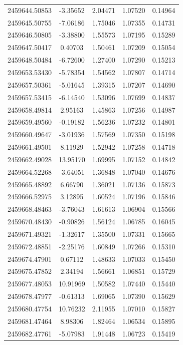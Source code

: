 \documentclass[traditabstract,longauth]{aa}
\begin{document}
\begin{longtable}{lcccc}
2459644.50853 & -3.35652 & 2.04471 & 1.07520 & 0.14964\\
2459645.50755 & -7.06186 & 1.75046 & 1.07355 & 0.14731\\
2459646.50805 & -3.38800 & 1.55573 & 1.07195 & 0.15289\\
2459647.50417 & 0.40703 & 1.50461 & 1.07209 & 0.15054\\
2459648.50484 & -6.72600 & 1.27400 & 1.07290 & 0.15213\\
2459653.53430 & -5.78354 & 1.54562 & 1.07807 & 0.14714\\
2459657.50361 & -5.01645 & 1.39315 & 1.07207 & 0.14690\\
2459657.53415 & -6.14540 & 1.53096 & 1.07699 & 0.14837\\
2459658.49814 & 2.95163 & 1.45863 & 1.07256 & 0.14987\\
2459659.49560 & -0.19182 & 1.56236 & 1.07232 & 0.14801\\
2459660.49647 & -3.01936 & 1.57569 & 1.07350 & 0.15198\\
2459661.49501 & 8.11929 & 1.52942 & 1.07258 & 0.14718\\
2459662.49028 & 13.95170 & 1.69995 & 1.07152 & 0.14842\\
2459664.52268 & -3.64051 & 1.36848 & 1.07040 & 0.14676\\
2459665.48892 & 6.66790 & 1.36021 & 1.07136 & 0.15873\\
2459666.52975 & 3.12895 & 1.60524 & 1.07196 & 0.15846\\
2459668.48463 & -3.76043 & 1.61613 & 1.06904 & 0.15566\\
2459670.48430 & -0.90826 & 1.56124 & 1.06785 & 0.16045\\
2459671.49321 & -1.32617 & 1.35500 & 1.07331 & 0.15665\\
2459672.48851 & -2.25176 & 1.60849 & 1.07266 & 0.15310\\
2459674.47901 & 0.67112 & 1.48633 & 1.07033 & 0.15450\\
2459675.47852 & 2.34194 & 1.56661 & 1.06851 & 0.15729\\
2459677.48053 & 10.91969 & 1.50582 & 1.07440 & 0.15440\\
2459678.47977 & -0.61313 & 1.69065 & 1.07390 & 0.15629\\
2459680.47754 & 10.76232 & 2.11955 & 1.07010 & 0.15827\\
2459681.47464 & 8.98306 & 1.82464 & 1.06534 & 0.15895\\
2459682.47761 & -5.07983 & 1.91448 & 1.06723 & 0.15419\\

\end{longtable}
\end{document}
